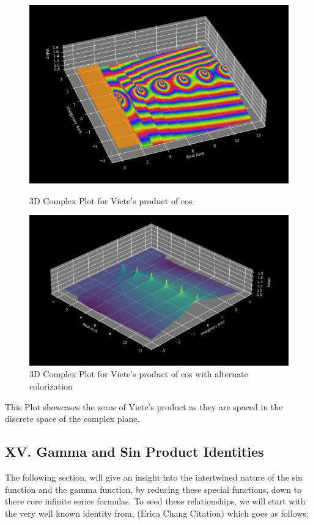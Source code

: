 \documentclass{article}
\begin{document}
\begin{figure}[ht]
\begin{minipage}[b]{0.45\textwidth}
\includegraphics[scale=0.30]{graphs/3D_Complex_Graphs/Viete_cos/Viete_cos_norm_1}
\caption{3D Complex Plot for Viete's product of cos}
\end{minipage}
\hfill
\begin{minipage}[b]{0.45\textwidth}
\includegraphics[scale=0.30]{graphs/3D_Complex_Graphs/Viete_cos/Viete_cos_norm_3}
\caption{3D Complex Plot for Viete's product of cos with alternate colorization}
\end{minipage}
\end{figure}

This Plot showcases the zeros of Viete's product as they are spaced in the discrete space of the complex plane.

\newpage
\subsection*{XV. Gamma and Sin Product Identities}
The following section, will give an insight into the intertwined nature of the sin function and the gamma function, by reducing these special functions, down to there core infinite series formulas.
To seed these relationships, we will start with the very well known identity from, (Erica Chang Citation) which goes as follows:
\end{document}

